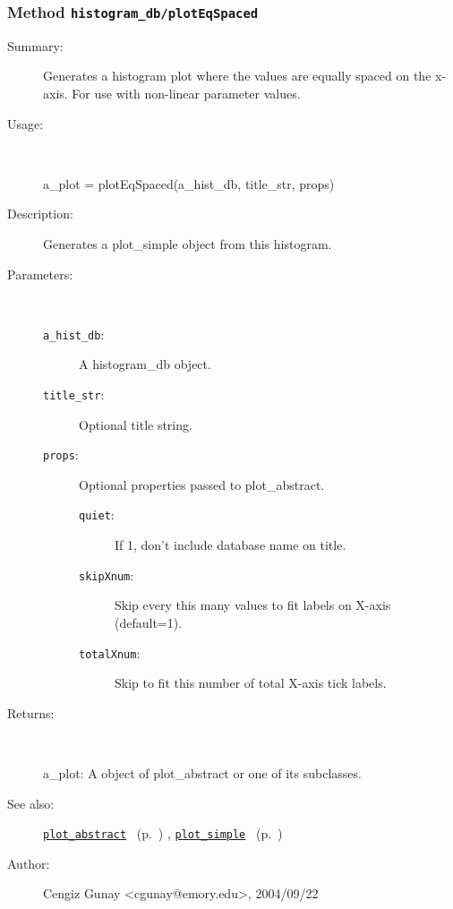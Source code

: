 \subsubsection[Method \texttt{plotEqSpaced}]{Method \texttt{histogram\_db/plotEqSpaced}}%
%
\label{ref_histogram_db__plotEqSpaced}%
\hypertarget{ref_histogram_db__plotEqSpaced}{}%
\begin{description}
\item[Summary:]Generates a histogram plot where the values are equally spaced on the x-axis. For use with non-linear parameter values.
%
\item[Usage:]~%
\begin{lyxcode}%
a\_plot = plotEqSpaced(a\_hist\_db, title\_str, props)
%
\end{lyxcode}%
%
\item[Description:]%
Generates a plot\_simple object from this histogram.
\item[Parameters:]~
\begin{description}%
\item[\texttt{a\_hist\_db}:]
 A histogram\_db object.
\item[\texttt{title\_str}:]
 Optional title string.
\item[\texttt{props}:]
 Optional properties passed to plot\_abstract.
\begin{description}%
\item[\texttt{quiet}:]
 If 1, don't include database name on title.
\item[\texttt{skipXnum}:]
 Skip every this many values to fit labels on X-axis (default=1).
\item[\texttt{totalXnum}:]
 Skip to fit this number of total X-axis tick labels.
\end{description}%
\end{description}%
%
\item[Returns:
]~

   a\_plot: A object of plot\_abstract or one of its subclasses.
%
%
\item[See also:]%
\hyperlink{ref_plot_abstract}{\texttt{plot\_abstract}}%
\ (p.~\pageref{ref_plot_abstract})%
%
, \hyperlink{ref_plot_simple}{\texttt{plot\_simple}}%
\ (p.~\pageref{ref_plot_simple})%
%
%
\item[Author:]%
Cengiz Gunay <cgunay@emory.edu>, 2004/09/22
%
\end{description}
\methodline%
